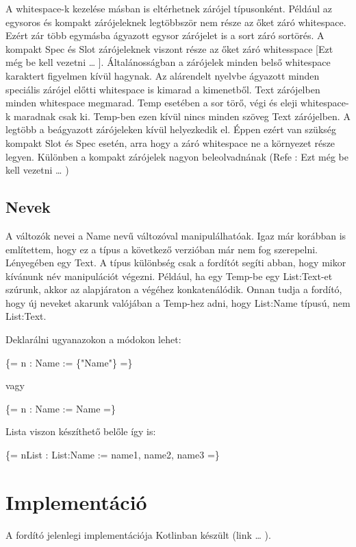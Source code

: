 A whitespace-k kezelése másban is eltérhetnek zárójel típusonként. 
Például az egysoros és kompakt zárójeleknek legtöbbször nem része az őket záró whitespace. 
Ezért zár több egymásba ágyazott egysor zárójelet is a sort záró sortörés. 
A kompakt Spec és Slot zárójeleknek viszont része az őket záró whitesspace [Ezt még be kell vezetni … ]. 
Általánosságban a zárójelek minden belső whitespace karaktert figyelmen kívül hagynak. 
Az alárendelt nyelvbe ágyazott minden speciális zárójel előtti whitespace is kimarad a kimenetből. 
Text zárójelben minden whitespace megmarad. 
Temp esetében a sor törő, végi és eleji whitespace-k maradnak csak ki. 
Temp-ben ezen kívül nincs minden szöveg Text zárójelben. 
A legtöbb a beágyazott zárójeleken kívül helyezkedik el. 
Éppen ezért van szükség kompakt Slot és Spec esetén, arra hogy a záró whitespace ne a környezet része legyen. 
Különben a kompakt zárójelek nagyon beleolvadnának (Refe : Ezt még be kell vezetni … )


\subsection{Nevek}
A változók nevei a Name nevű változóval manipulálhatóak.
Igaz már korábban is említettem, hogy ez a típus a következő verzióban már nem fog szerepelni.
Lényegében egy Text.
A típus különbség csak a fordítót segíti abban, hogy mikor kívánunk név manipulációt végezni.
Például, ha egy Temp-be egy List:Text-et szúrunk, akkor az alapjáraton a végéhez konkatenálódik.
Onnan tudja a fordító, hogy új neveket akarunk valójában a Temp-hez adni, hogy List:Name típusú, nem List:Text.

Deklarálni ugyanazokon a módokon lehet:

\{= n : Name := \{"Name"\} =\}

vagy

\{= n : Name := Name =\}

Lista viszon készíthető belőle így is:

\{= nList : List:Name := name1, name2, name3 =\}


\section{Implementáció}
A fordító jelenlegi implementációja Kotlinban készült (link … ).

